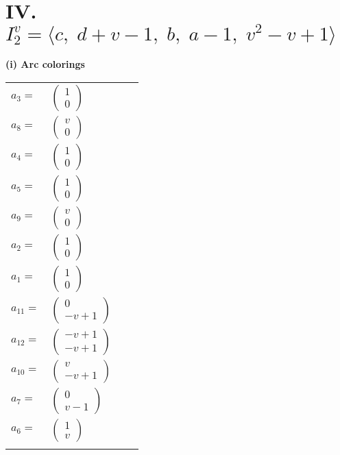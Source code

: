 \documentclass[1p]{elsarticle_modified}
\theoremstyle{definition}
\begin{document}
\centering \section*{IV. $I^v_{2}= \langle c,\;d+v-1,\;b,\;a-1,\;v^2- v+1 \rangle$}
\flushleft \textbf{(i) Arc colorings}\\
\begin{tabular}{m{7pt} m{180pt} m{7pt} m{180pt} }
\flushright $a_{3}=$&$\begin{pmatrix}1\\0\end{pmatrix}$ \\
\flushright $a_{8}=$&$\begin{pmatrix}v\\0\end{pmatrix}$ \\
\flushright $a_{4}=$&$\begin{pmatrix}1\\0\end{pmatrix}$ \\
\flushright $a_{5}=$&$\begin{pmatrix}1\\0\end{pmatrix}$ \\
\flushright $a_{9}=$&$\begin{pmatrix}v\\0\end{pmatrix}$ \\
\flushright $a_{2}=$&$\begin{pmatrix}1\\0\end{pmatrix}$ \\
\flushright $a_{1}=$&$\begin{pmatrix}1\\0\end{pmatrix}$ \\
\flushright $a_{11}=$&$\begin{pmatrix}0\\- v+1\end{pmatrix}$ \\
\flushright $a_{12}=$&$\begin{pmatrix}- v+1\\- v+1\end{pmatrix}$ \\
\flushright $a_{10}=$&$\begin{pmatrix}v\\- v+1\end{pmatrix}$ \\
\flushright $a_{7}=$&$\begin{pmatrix}0\\v-1\end{pmatrix}$ \\
\flushright $a_{6}=$&$\begin{pmatrix}1\\v\end{pmatrix}$\\&\end{tabular}
\end{document}
